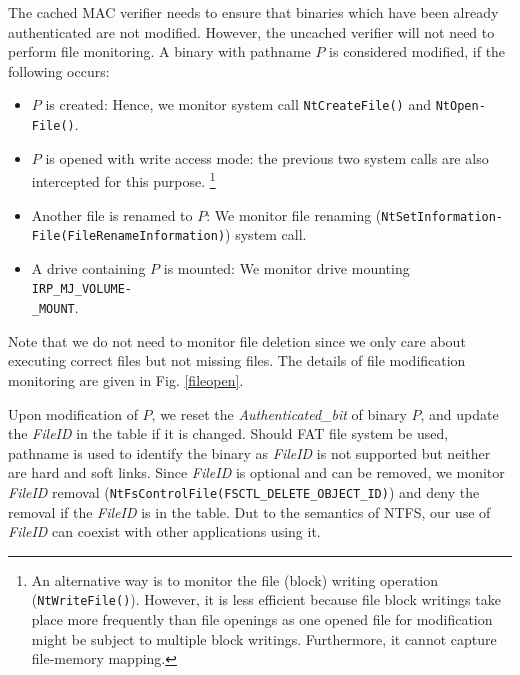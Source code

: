 The cached MAC verifier needs to ensure that binaries which have
been already authenticated are not modified.
However, the uncached verifier will not need to perform file monitoring.
A binary with pathname $P$ is considered modified, if the following occurs:
\begin{itemize}
\item $P$ is created: Hence, we monitor system call
{\tt NtCreateFile()} and {\tt NtOpen-\\File()}.
\item $P$ is opened with write access mode: the previous two
system calls are also intercepted for this purpose.
\footnote{An alternative way is to monitor the file (block) writing operation ({\tt NtWriteFile()}).
However, it is less efficient because file block writings take place more frequently
than file openings as one opened file for modification might be subject to 
multiple block writings. Furthermore, it cannot capture file-memory mapping.}
\item Another file is renamed to $P$: 
We monitor file renaming ({\tt NtSetInformation-\\File\linebreak[0](\linebreak[0]FileRenameInformation\linebreak[0])})
system call.
\item A drive containing $P$ is mounted:
We monitor drive mounting {\tt IRP\_MJ\_VOLUME-\\\_MOUNT}.
\end{itemize}

\noindent
Note that we do not need to monitor file deletion since we only care about
executing correct files but not missing files.
The details of file modification monitoring are given in Fig. \ref{fileopen}.

Upon modification of $P$, we reset the {\it Authenticated\_bit} of binary $P$, 
and update the {\it FileID} in the table if it is changed.
Should FAT file system be used, pathname is used 
to identify the binary as {\it FileID} is not supported but
neither are hard and soft links.
Since {\it FileID} is optional and can be removed,
we monitor {\it FileID} removal ({\tt NtFsControlFile(FSCTL\_DELETE\_OBJECT\_ID)})
and deny the removal if the {\it FileID} is in the table.
Dut to the semantics of NTFS, our use of {\it FileID} can
coexist with other applications using it.


